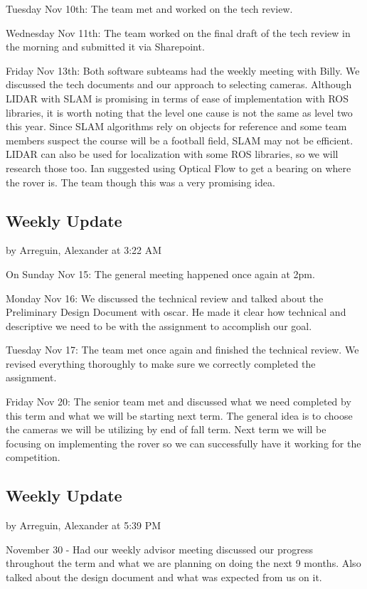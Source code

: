 \documentclass[10pt, oneside,onecolumn]{IEEEtran}
\begin{document}
\begin{titlepage}
Tuesday Nov 10th: The team met and worked on the tech review.

Wednesday Nov 11th: The team worked on the final draft of the tech review in the morning and submitted it via Sharepoint.

Friday Nov 13th: Both software subteams had the weekly meeting with Billy. We discussed the tech documents and our approach to selecting cameras. Although LIDAR with SLAM is promising in terms of ease of implementation with ROS libraries, it is worth noting that the level one cause is not the same as level two this year. Since SLAM algorithms rely on objects for reference and some team members suspect the course will be a football field, SLAM may not be efficient. LIDAR can also be used for localization with some ROS libraries, so we will research those too. Ian suggested using Optical Flow to get a bearing on where the rover is. The team though this was a very promising idea. 

\subsection{Weekly Update}
by Arreguin, Alexander at 3:22 AM

On Sunday Nov 15: The general meeting happened once again at 2pm. 

Monday Nov  16:  We discussed the technical review and talked about the Preliminary Design Document with oscar. He made it clear how technical and descriptive we need to be with the assignment to accomplish our goal.

Tuesday Nov 17: The team met once again and finished the technical review. We revised everything thoroughly to make sure we correctly completed the assignment. 

Friday Nov 20: The senior team met and discussed what we need completed by this term and what we will be starting next term. The general idea is to choose the cameras we will be utilizing by end of fall term. Next term we will be focusing on implementing the rover so we can successfully have it working for the competition.

\subsection{Weekly Update}
by Arreguin, Alexander at 5:39 PM

November 30 - Had our weekly advisor meeting discussed our progress throughout the term and what we are planning on doing the next 9 months. Also talked about the design document and what was expected from us on it. 


\end{titlepage}
\end{document}
